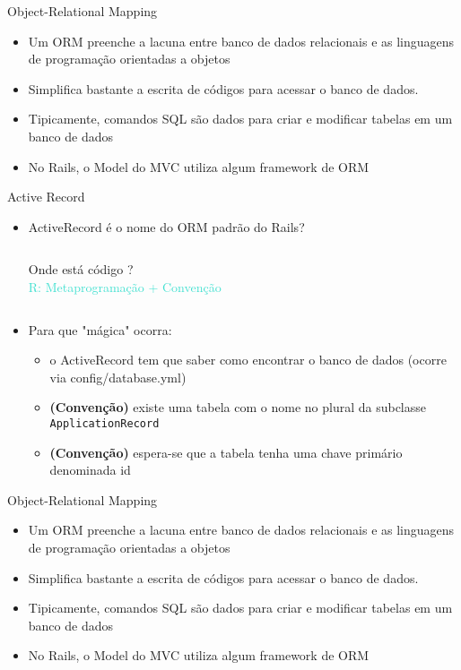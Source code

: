 \begin{frame}{Object-Relational Mapping}
	\begin{itemize}
		\item Um ORM \alert{preenche a lacuna} entre banco de dados relacionais e as linguagens de programação
			orientadas a objetos
		\item \alert{Simplifica} bastante a escrita de códigos para acessar o banco de dados.
		\item Tipicamente, comandos SQL são dados para criar e modificar tabelas em um
		banco de dados
		\item No Rails, o Model do MVC utiliza algum framework de ORM
	\end{itemize}	
\end{frame}

\begin{frame}{Active Record}
	\begin{itemize}
		\item ActiveRecord é o nome do \alert{ORM padrão} do Rails?
		\vspace{15pt}
		\begin{columns}[t]
			
			\alert{\Large Onde está código ?}
			\\
			\textcolor{Turquoise}{\Large R: Metaprogramação + Convenção}
		\end{columns}
		
		\item Para que \alert{"mágica"} ocorra:
		\begin{itemize}
			\item o ActiveRecord tem que saber como encontrar o banco de dados (ocorre via \alert{config/database.yml})
			\item \textbf{(Convenção)} existe uma \alert{tabela} com o \alert{nome no plural} da subclasse \verb|ApplicationRecord|
			\item \textbf{(Convenção)} espera-se que a tabela tenha uma chave primário denominada \alert{id}
		\end{itemize}
	\end{itemize}
\end{frame}

\begin{frame}{Object-Relational Mapping}
	\begin{itemize}
		\item Um ORM \alert{preenche a lacuna} entre banco de dados relacionais e as linguagens de programação
		orientadas a objetos
		\item \alert{Simplifica} bastante a escrita de códigos para acessar o banco de dados.
		\item Tipicamente, comandos SQL são dados para criar e modificar tabelas em um
		banco de dados
		\item No Rails, o Model do MVC utiliza algum framework de ORM
	\end{itemize}	
\end{frame}

